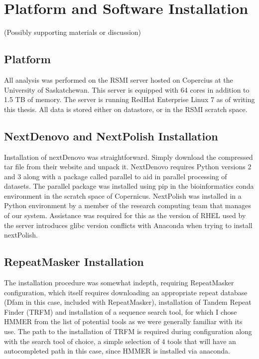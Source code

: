\section{Platform and Software Installation}
(Possibly supporting materials or discussion)

\subsection{Platform}
All analysis was performed on the RSMI server hosted on Copercius at
the University of Saskatchewan. This server is equipped with 64 cores
in addition to 1.5 TB of memory. The server is running RedHat
Enterprise Linux 7 as of writing this thesis. All data is stored
either on datastore, or in the RSMI scratch space.

\subsection{NextDenovo and NextPolish Installation}
Installation of nextDenovo was straightforward. Simply download the
compressed tar file from their website and unpack it. NextDenovo
requires Python versions 2 and 3 along with a package called parallel
to aid in parallel processing of datasets. The parallel package was
installed using pip in the bioinformatics conda environment in the
scratch space of Copernicus. NextPolish was installed in a Python
environment by a member of the research computing team that manages of
our system. Assistance was required for this as the version of RHEL
used by the server introduces glibc version conflicts with Anaconda
when trying to install nextPolish. 

\subsection{RepeatMasker Installation}

The installation procedure was somewhat indepth, requiring
RepeatMasker configuration, which itself requires downloading an
appropriate repeat database (Dfam in this case, included with
RepeatMasker), installation of Tandem Repeat Finder (TRFM) and
installation of a sequence search tool, for which I chose HMMER from
the list of potential tools as we were generally familiar with its
use. The path to the installation of TRFM is required during
configuration along with the search tool of choice, a simple selection
of 4 tools that will have an autocompleted path in this case, since
HMMER is installed via anaconda.

